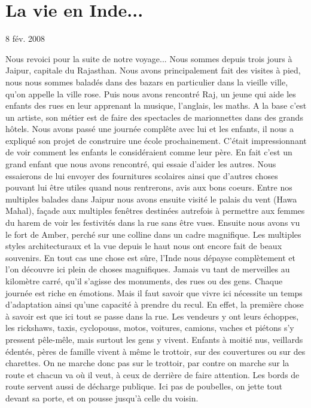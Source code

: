 \section{La vie en Inde...}

8 fév. 2008

\begin{multicols}{2}

Nous revoici pour la suite de notre voyage... Nous sommes depuis trois jours à Jaipur, capitale du Rajasthan. Nous avons principalement fait des visites à pied, nous nous sommes baladés dans des bazars en particulier dans la vieille ville, qu'on appelle la ville rose. Puis nous avons rencontré Raj, un jeune qui aide les enfants des rues en leur apprenant la musique, l'anglais, les maths. A la base c'est un artiste, son métier est de faire des spectacles de marionnettes dans des grands hôtels. Nous avons passé une journée complête avec lui et les enfants, il nous a expliqué son projet de construire une école prochainement. C'était impressionnant de voir comment les enfants le considéraient comme leur père. En fait c'est un grand enfant que nous avons rencontré, qui essaie d'aider les autres. Nous essaierons de lui envoyer des fournitures scolaires ainsi que d'autres choses pouvant lui être utiles quand nous rentrerons, avis aux bons coeurs. Entre nos multiples balades dans Jaipur nous avons ensuite visité le palais du vent (Hawa Mahal), façade aux multiples fenêtres destinées autrefois à permettre aux femmes du harem de voir les festivités dans la rue sans être vues. Ensuite nous avons vu le fort de Amber, perché sur une colline dans un cadre magnifique. Les multiples styles architecturaux et la vue depuis le haut nous ont encore fait de beaux souvenirs. En tout cas une chose est sûre, l'Inde nous dépayse complètement et l'on découvre ici plein de choses magnifiques. Jamais vu tant de merveilles au kilomètre carré, qu'il s'agisse des monuments, des rues ou des gens. Chaque journée est riche en émotions. Mais il faut savoir que vivre ici nécessite un temps d'adaptation ainsi qu'une capacité à prendre du recul. En effet, la première chose à savoir est que ici tout se passe dans la rue. Les vendeurs y ont leurs échoppes, les rickshaws, taxis, cyclopouss, motos, voitures, camions, vaches et piétons s'y pressent pêle-mêle, mais surtout les gens y vivent. Enfants à moitié nus, veillards édentés, pères de famille vivent à même le trottoir, sur des couvertures ou sur des charettes. On ne marche donc pas sur le trottoir, par contre on marche sur la route et chacun va où il veut, à ceux de derrière de faire attention. Les bords de route servent aussi de décharge publique. Ici pas de poubelles, on jette tout devant sa porte, et on pousse jusqu'à celle du voisin.


\end{multicols}
